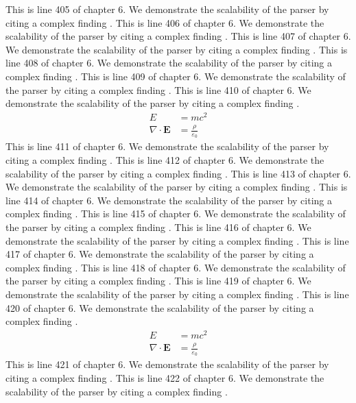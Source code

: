 This is line 405 of chapter 6. We demonstrate the scalability of the parser by citing a complex finding \cite{ref6_405}.
This is line 406 of chapter 6. We demonstrate the scalability of the parser by citing a complex finding \cite{ref6_406}.
This is line 407 of chapter 6. We demonstrate the scalability of the parser by citing a complex finding \cite{ref6_407}.
This is line 408 of chapter 6. We demonstrate the scalability of the parser by citing a complex finding \cite{ref6_408}.
This is line 409 of chapter 6. We demonstrate the scalability of the parser by citing a complex finding \cite{ref6_409}.
This is line 410 of chapter 6. We demonstrate the scalability of the parser by citing a complex finding \cite{ref6_410}.
\begin{align*}
  E &= mc^2 \\
  \nabla \cdot \mathbf{E} &= \frac{\rho}{\varepsilon_0}
\end{align*}
This is line 411 of chapter 6. We demonstrate the scalability of the parser by citing a complex finding \cite{ref6_411}.
This is line 412 of chapter 6. We demonstrate the scalability of the parser by citing a complex finding \cite{ref6_412}.
This is line 413 of chapter 6. We demonstrate the scalability of the parser by citing a complex finding \cite{ref6_413}.
This is line 414 of chapter 6. We demonstrate the scalability of the parser by citing a complex finding \cite{ref6_414}.
This is line 415 of chapter 6. We demonstrate the scalability of the parser by citing a complex finding \cite{ref6_415}.
This is line 416 of chapter 6. We demonstrate the scalability of the parser by citing a complex finding \cite{ref6_416}.
This is line 417 of chapter 6. We demonstrate the scalability of the parser by citing a complex finding \cite{ref6_417}.
This is line 418 of chapter 6. We demonstrate the scalability of the parser by citing a complex finding \cite{ref6_418}.
This is line 419 of chapter 6. We demonstrate the scalability of the parser by citing a complex finding \cite{ref6_419}.
This is line 420 of chapter 6. We demonstrate the scalability of the parser by citing a complex finding \cite{ref6_420}.
\begin{align*}
  E &= mc^2 \\
  \nabla \cdot \mathbf{E} &= \frac{\rho}{\varepsilon_0}
\end{align*}
This is line 421 of chapter 6. We demonstrate the scalability of the parser by citing a complex finding \cite{ref6_421}.
This is line 422 of chapter 6. We demonstrate the scalability of the parser by citing a complex finding \cite{ref6_422}.
